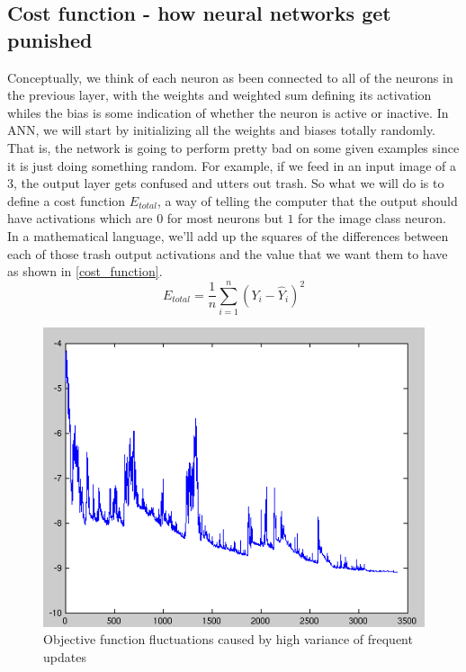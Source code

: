 \documentclass[master]{thesis-uestc}
\begin{document}
\subsection{Cost function - how neural networks get punished}
Conceptually, we think of each neuron as been connected to all of the neurons in the previous layer, with the weights and weighted sum defining its activation whiles the bias is some indication of whether the neuron is active or inactive. In ANN, we will start by initializing all the weights and biases totally randomly. That is, the network is going to perform pretty bad on some given examples since it is just doing something random. For example, if we feed in an input image of a $3$, the output layer gets confused and utters out trash. So what we will do is to define a cost function $E_{total}$, a way of telling the computer that the output should have activations which are $0$ for most neurons but $1$ for the image class neuron. In a mathematical language, we'll add up the squares of the differences between each of those trash output activations and the value that we want them to have as shown in \ref{cost_function}.
\begin{equation}
    E_{total} = \frac{1}{n}\sum_{i=1}^{n} (Y_i - \hat{Y}_i)^2
    \label{cost_function}
\end{equation}

\begin{figure}[ht]
\includegraphics[width=5in]{pic/fluctuation.png}
\caption{Objective function fluctuations caused by high variance of frequent updates}
\label{SGD}
\end{figure}
\end{document}
